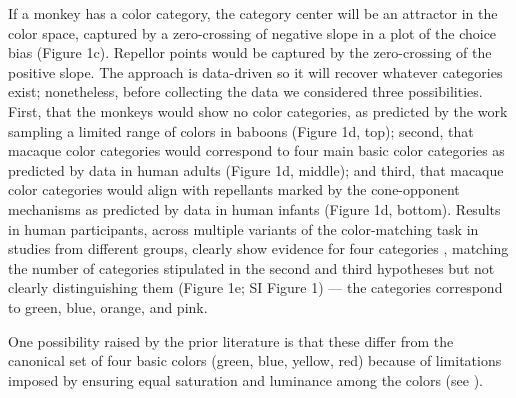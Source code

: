 If a monkey has a color category, the category center will be an attractor in the color space, captured by a zero-crossing of negative slope in a plot of the choice bias (Figure 1c). 
Repellor points would be captured by the zero-crossing of the positive slope.
The approach is data-driven so it will recover whatever categories exist; nonetheless, before collecting the data we considered three possibilities. 
First, that the monkeys would show no color categories, as predicted by the work sampling a limited range of colors in baboons \citep{davidoff_cross-species_2010}
(Figure 1d, top);
second, that macaque color categories would correspond to  four main basic color categories as predicted by data in human adults (Figure 1d, middle); 
and third, that macaque color categories would align with repellants marked by the cone-opponent mechanisms as predicted by data in human infants \citep{skelton_biological_2017} (Figure 1d, bottom). 
Results in human participants, across multiple variants of the color-matching task in studies from different groups, clearly show evidence for four categories \citep{bae_why_2015,panichello_error-correcting_2019}, matching the number of categories stipulated in the second and third hypotheses but not clearly distinguishing them (Figure 1e; SI Figure 1) — the categories correspond to green, blue, orange, and pink. 

One possibility raised by the prior literature is that these differ from the canonical set of four basic colors (green, blue, yellow, red) because of limitations imposed by ensuring equal saturation and luminance among the colors (see \citep{bae_why_2015}). 
